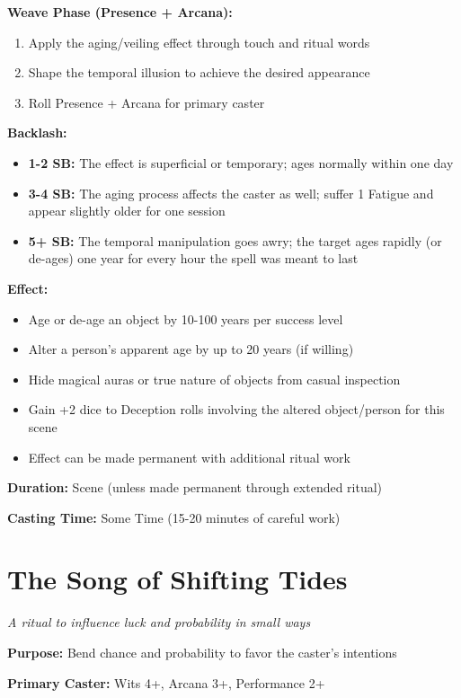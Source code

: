 \textbf{Weave Phase (Presence + Arcana):}
\begin{enumerate}
\item Apply the aging/veiling effect through touch and ritual words
\item Shape the temporal illusion to achieve the desired appearance
\item Roll Presence + Arcana for primary caster
\end{enumerate}

\textbf{Backlash:}
\begin{itemize}
\item \textbf{1-2 SB:} The effect is superficial or temporary; ages normally within one day
\item \textbf{3-4 SB:} The aging process affects the caster as well; suffer 1 Fatigue and appear slightly older for one session
\item \textbf{5+ SB:} The temporal manipulation goes awry; the target ages rapidly (or de-ages) one year for every hour the spell was meant to last
\end{itemize}

\textbf{Effect:}
\begin{itemize}
\item Age or de-age an object by 10-100 years per success level
\item Alter a person's apparent age by up to 20 years (if willing)
\item Hide magical auras or true nature of objects from casual inspection
\item Gain +2 dice to Deception rolls involving the altered object/person for this scene
\item Effect can be made permanent with additional ritual work
\end{itemize}

\textbf{Duration:} Scene (unless made permanent through extended ritual)

\textbf{Casting Time:} Some Time (15-20 minutes of careful work)

\section*{The Song of Shifting Tides}
\textit{A ritual to influence luck and probability in small ways}

\textbf{Purpose:} Bend chance and probability to favor the caster's intentions

\textbf{Primary Caster:} Wits 4+, Arcana 3+, Performance 2+


